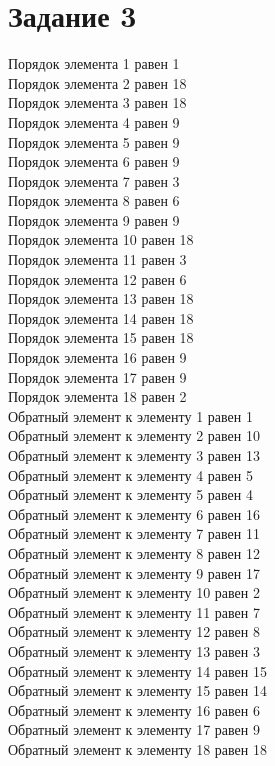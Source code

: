 	\section*{Задание 3}
	Порядок элемента 1 равен 1 \\
	Порядок элемента 2 равен 18 \\
	Порядок элемента 3 равен 18 \\
	Порядок элемента 4 равен 9 \\
	Порядок элемента 5 равен 9 \\
	Порядок элемента 6 равен 9 \\
	Порядок элемента 7 равен 3 \\
	Порядок элемента 8 равен 6 \\
	Порядок элемента 9 равен 9 \\
	Порядок элемента 10 равен 18 \\
	Порядок элемента 11 равен 3 \\
	Порядок элемента 12 равен 6 \\
	Порядок элемента 13 равен 18 \\
	Порядок элемента 14 равен 18 \\
	Порядок элемента 15 равен 18 \\
	Порядок элемента 16 равен 9 \\
	Порядок элемента 17 равен 9 \\
	Порядок элемента 18 равен 2 \\
	Обратный элемент к элементу  1 равен 1 \\
	Обратный элемент к элементу  2 равен 10 \\
	Обратный элемент к элементу  3 равен 13 \\
	Обратный элемент к элементу  4 равен 5 \\
	Обратный элемент к элементу  5 равен 4 \\
	Обратный элемент к элементу  6 равен 16 \\
	Обратный элемент к элементу  7 равен 11 \\
	Обратный элемент к элементу  8 равен 12 \\
	Обратный элемент к элементу  9 равен 17 \\
	Обратный элемент к элементу  10 равен 2 \\
	Обратный элемент к элементу  11 равен 7 \\
	Обратный элемент к элементу  12 равен 8 \\
	Обратный элемент к элементу  13 равен 3 \\
	Обратный элемент к элементу  14 равен 15 \\
	Обратный элемент к элементу  15 равен 14 \\
	Обратный элемент к элементу  16 равен 6 \\
	Обратный элемент к элементу  17 равен 9 \\
	Обратный элемент к элементу  18 равен 18 \\
